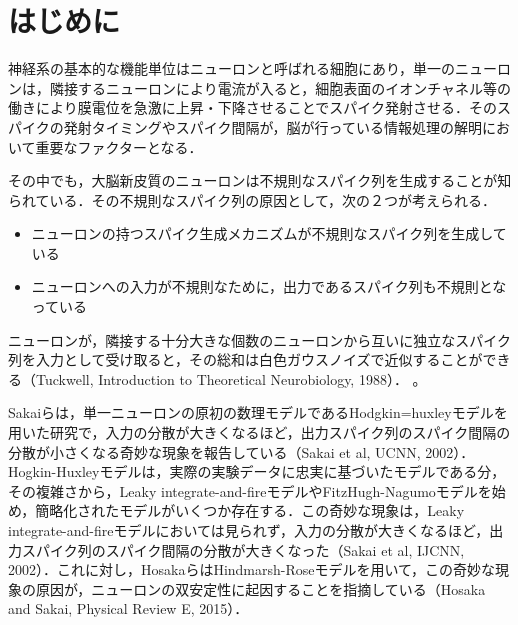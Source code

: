 \documentclass[dvipdfmx, A4j, twocolumn, 10.5pt]{jsarticle}
\begin{document}
\thispagestyle{empty} %
\section{はじめに}

神経系の基本的な機能単位はニューロンと呼ばれる細胞にあり，単一のニューロンは，隣接するニューロンにより電流が入ると，細胞表面のイオンチャネル等の働きにより膜電位を急激に上昇・下降させることでスパイク発射させる．そのスパイクの発射タイミングやスパイク間隔が，脳が行っている情報処理の解明において重要なファクターとなる．

その中でも，大脳新皮質のニューロンは不規則なスパイク列を生成することが知られている．その不規則なスパイク列の原因として，次の２つが考えられる．

\begin{itemize}
 \item ニューロンの持つスパイク生成メカニズムが不規則なスパイク列を生成している
 \item ニューロンへの入力が不規則なために，出力であるスパイク列も不規則となっている
\end{itemize}

ニューロンが，隣接する十分大きな個数のニューロンから互いに独立なスパイク列を入力として受け取ると，その総和は白色ガウスノイズで近似することができる（Tuckwell, Introduction to Theoretical Neurobiology, 1988）．
\cite{lite1}。

Sakaiらは，単一ニューロンの原初の数理モデルであるHodgkin=huxleyモデルを用いた研究で，入力の分散が大きくなるほど，出力スパイク列のスパイク間隔の分散が小さくなる奇妙な現象を報告している（Sakai et al, UCNN, 2002）．Hogkin-Huxleyモデルは，実際の実験データに忠実に基づいたモデルである分，その複雑さから，Leaky integrate-and-fireモデルやFitzHugh-Nagumoモデルを始め，簡略化されたモデルがいくつか存在する．この奇妙な現象は，Leaky integrate-and-fireモデルにおいては見られず，入力の分散が大きくなるほど，出力スパイク列のスパイク間隔の分散が大きくなった（Sakai et al, IJCNN, 2002）．これに対し，HosakaらはHindmarsh-Roseモデルを用いて，この奇妙な現象の原因が，ニューロンの双安定性に起因することを指摘している（Hosaka and Sakai, Physical Review E, 2015）．
\end{document}

